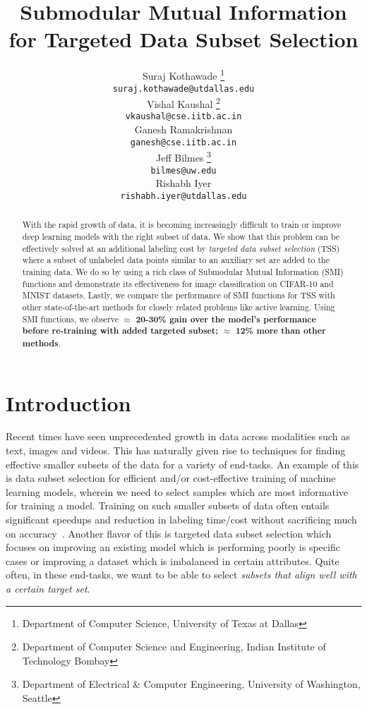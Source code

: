 \documentclass{article}
\title{Submodular Mutual Information for Targeted Data Subset Selection}
\author{Suraj Kothawade \thanks{Department of Computer Science, University of Texas at Dallas}\\
\texttt{suraj.kothawade@utdallas.edu} \\
\And
Vishal Kaushal \thanks{Department of Computer Science and Engineering, Indian Institute of Technology Bombay}\\
\texttt{vkaushal@cse.iitb.ac.in} \\
\And
Ganesh Ramakrishnan \samethanks \\
\texttt{ganesh@cse.iitb.ac.in} \\
\And
Jeff Bilmes \thanks{Department of Electrical \& Computer Engineering, University of Washington, Seattle}\\
\texttt{bilmes@uw.edu} \\
\And
Rishabh Iyer \samethanks[1]\\
\texttt{rishabh.iyer@utdallas.edu} \\
}
\newcommand{\modelss}{\mbox{\textsc{TSS}}}
\begin{document}
\begin{center}
    \maketitle
\end{center}


\begin{abstract}
With the rapid growth of data, it is becoming increasingly difficult to train or improve deep learning models with the right subset of data. We show that this problem can be effectively solved at an additional labeling cost by \textit{targeted data subset selection} (\modelss) where a subset of unlabeled data points similar to an auxiliary set are added to the training data. We do so by using a rich class of Submodular Mutual Information (SMI) functions and demonstrate its effectiveness for image classification on CIFAR-10 and MNIST datasets. Lastly, we compare the performance of SMI functions for \modelss \vspace{0.5pt} with other state-of-the-art methods for closely related problems like active learning. Using SMI functions, we observe \textbf{$\approx$ 20-30\% gain over the model's performance before re-training with added targeted subset; $\approx$ 12\% more than other methods}.
\end{abstract}

\section{Introduction}
Recent times have seen unprecedented growth in data across modalities such as text, images and videos. This has naturally given rise to techniques for finding effective smaller subsets of the data for a variety of end-tasks. An example of this is data subset selection for efficient and/or cost-effective training of machine learning models, wherein we need to select samples which are most informative for training a model. Training on such smaller subsets of data often entails significant speedups and reduction in labeling time/cost without sacrificing much on accuracy~\citep{killamsetty2020glister,kaushal2019learning,wei2015submodularity}. Another flavor of this is targeted data subset selection which focuses on improving an existing model which is performing poorly is specific cases or improving a dataset which is imbalanced in certain attributes. Quite often, in these end-tasks, we want to be able to select {\em subsets that align well with a certain target set}. 
\end{document}
